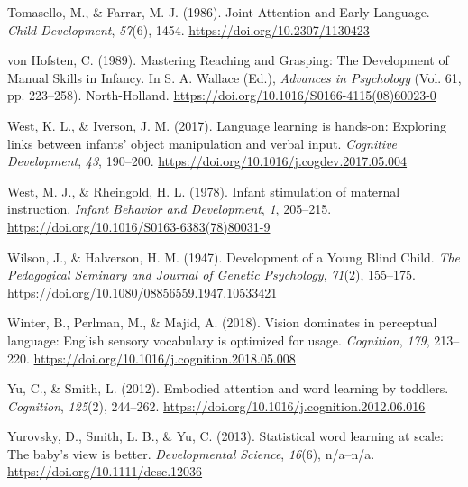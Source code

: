 \documentclass[
  man,floatsintext]{apa6}
\newlength{\cslhangindent}
\newlength{\cslentryspacingunit} %
\newenvironment{CSLReferences}[2] %
 {%
  \setlength{\parindent}{0pt}
  \ifodd #1
  \let\oldpar\par
  \def\par{\hangindent=\cslhangindent\oldpar}
  \fi
  \setlength{\parskip}{#2\cslentryspacingunit}
 }%
 {}
\begin{document}
\begin{CSLReferences}{1}{0}
\leavevmode{}%
Tomasello, M., \& Farrar, M. J. (1986). Joint {Attention} and {Early Language}. \emph{Child Development}, \emph{57}(6), 1454. \url{https://doi.org/10.2307/1130423}

\leavevmode{}%
von Hofsten, C. (1989). Mastering {Reaching} and {Grasping}: {The Development} of {Manual Skills} in {Infancy}. In S. A. Wallace (Ed.), \emph{Advances in {Psychology}} (Vol. 61, pp. 223--258). {North-Holland}. \url{https://doi.org/10.1016/S0166-4115(08)60023-0}

\leavevmode{}%
West, K. L., \& Iverson, J. M. (2017). Language learning is hands-on: {Exploring} links between infants' object manipulation and verbal input. \emph{Cognitive Development}, \emph{43}, 190--200. \url{https://doi.org/10.1016/j.cogdev.2017.05.004}

\leavevmode{}%
West, M. J., \& Rheingold, H. L. (1978). Infant stimulation of maternal instruction. \emph{Infant Behavior and Development}, \emph{1}, 205--215. \url{https://doi.org/10.1016/S0163-6383(78)80031-9}

\leavevmode{}%
Wilson, J., \& Halverson, H. M. (1947). Development of a {Young Blind Child}. \emph{The Pedagogical Seminary and Journal of Genetic Psychology}, \emph{71}(2), 155--175. \url{https://doi.org/10.1080/08856559.1947.10533421}

\leavevmode{}%
Winter, B., Perlman, M., \& Majid, A. (2018). Vision dominates in perceptual language: {English} sensory vocabulary is optimized for usage. \emph{Cognition}, \emph{179}, 213--220. \url{https://doi.org/10.1016/j.cognition.2018.05.008}

\leavevmode{}%
Yu, C., \& Smith, L. (2012). Embodied attention and word learning by toddlers. \emph{Cognition}, \emph{125}(2), 244--262. \url{https://doi.org/10.1016/j.cognition.2012.06.016}

\leavevmode{}%
Yurovsky, D., Smith, L. B., \& Yu, C. (2013). Statistical word learning at scale: The baby's view is better. \emph{Developmental Science}, \emph{16}(6), n/a--n/a. \url{https://doi.org/10.1111/desc.12036}

\end{CSLReferences}
\end{document}
